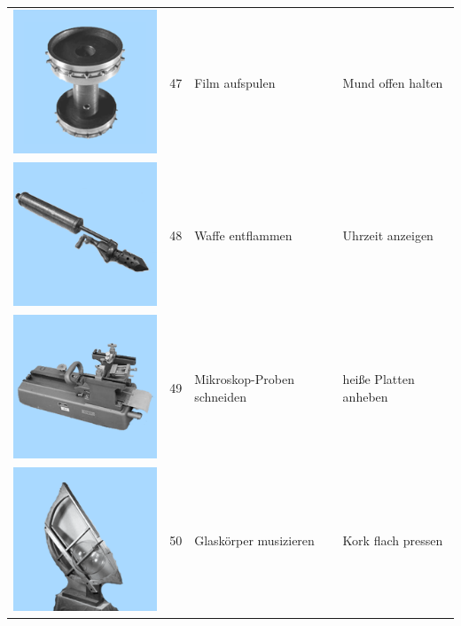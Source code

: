 \documentclass[
  english,
  man,floatsintext]{apa7}
\begin{document}
\begin{center}
\begin{ThreePartTable}
\begin{longtable}{llll}
\includegraphics[valign=c, scale=0.19]{../materials/unfamiliar/47.png} & 47 & Film aufspulen & Mund offen halten\\
\includegraphics[valign=c, scale=0.19]{../materials/unfamiliar/48.png} & 48 & Waffe entflammen & Uhrzeit anzeigen\\
\includegraphics[valign=c, scale=0.19]{../materials/unfamiliar/49.png} & 49 & Mikroskop-Proben schneiden & heiße Platten anheben\\
\includegraphics[valign=c, scale=0.19]{../materials/unfamiliar/50.png} & 50 & Glaskörper musizieren & Kork flach pressen\\

\end{longtable}
\end{ThreePartTable}
\end{center}
\end{document}

